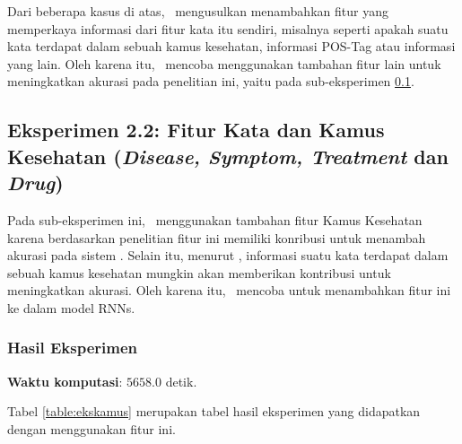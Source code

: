 	Dari beberapa kasus di atas, \saya~mengusulkan menambahkan fitur yang memperkaya informasi dari fitur kata itu sendiri, misalnya seperti apakah suatu kata terdapat dalam sebuah kamus kesehatan, informasi POS-Tag atau informasi yang lain. Oleh karena itu, \saya~mencoba menggunakan tambahan fitur lain untuk meningkatkan akurasi pada penelitian ini, yaitu pada sub-eksperimen \ref{eks:subeksdict}.
	
	\subsection{Eksperimen 2.2: Fitur Kata dan Kamus Kesehatan (\textit{Disease, Symptom, Treatment} dan \textit{Drug})}\label{eks:subeksdict}
	Pada sub-eksperimen ini, \saya~menggunakan tambahan fitur Kamus Kesehatan karena berdasarkan penelitian \cite{skripsiKakRadit} fitur ini memiliki konribusi untuk menambah akurasi pada sistem \mer. Selain itu, menurut \saya, informasi suatu kata terdapat dalam sebuah kamus kesehatan mungkin akan memberikan kontribusi untuk meningkatkan akurasi. Oleh karena itu, \saya~mencoba untuk menambahkan fitur ini ke dalam model RNNs.
	
	\subsubsection{Hasil Eksperimen}
	\textbf{Waktu komputasi}: $ 5658.0 $ detik.
	
	Tabel \ref{table:ekskamus} merupakan tabel hasil eksperimen yang didapatkan dengan menggunakan fitur ini.
	
